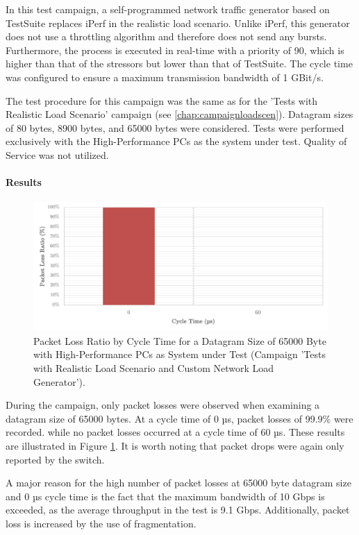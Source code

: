 In this test campaign, a self-programmed network traffic generator based on TestSuite replaces iPerf in the realistic load scenario. Unlike iPerf, this generator does not use a throttling algorithm and therefore does not send any bursts. Furthermore, the process is executed in real-time with a priority of 90, which is higher than that of the stressors but lower than that of TestSuite. The cycle time was configured to ensure a maximum transmission bandwidth of 1 GBit/s.

The test procedure for this campaign was the same as for the 'Tests with Realistic Load Scenario' campaign (see \ref{chap:campaignloadscen}). Datagram sizes of 80 bytes, 8900 bytes, and 65000 bytes were considered. Tests were performed exclusively with the High-Performance PCs as the system under test. Quality of Service was not utilized.

\paragraph{Results}

\begin{figure}[h!]
    \centering
    \includegraphics[width=1\linewidth]{figures/reliability/star/rel_d_5.pdf}
    \caption{Packet Loss Ratio by Cycle Time for a Datagram Size of 65000 Byte with High-Performance PCs as System under Test (Campaign 'Tests with Realistic Load Scenario and Custom Network Load Generator').}    \label{fig:srpr5}
\end{figure}

During the campaign, only packet losses were observed when examining a datagram size of 65000 bytes. At a cycle time of 0 µs, packet losses of 99.9\% were recorded. while no packet losses occurred at a cycle time of 60 µs. These results are illustrated in Figure \ref{fig:srpr5}. It is worth noting that packet drops were again only reported by the switch.

A major reason for the high number of packet losses at 65000 byte datagram size and 0 µs cycle time is the fact that the maximum bandwidth of 10 Gbps is exceeded, as the average throughput in the test is 9.1 Gbps. Additionally, packet loss is increased by the use of fragmentation.

